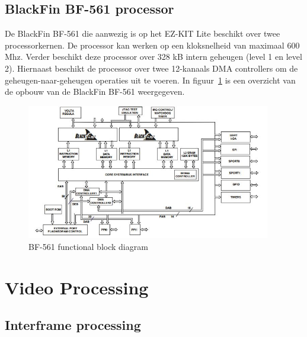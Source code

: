 	\section{BlackFin BF-561 processor}

		\par De BlackFin BF-561 die aanwezig is op het EZ-KIT Lite beschikt over twee processorkernen. De processor kan werken op een kloksnelheid van maximaal 600 Mhz. Verder beschikt deze processor over 328 kB intern geheugen (level 1 en level 2).  Hiernaast beschikt de processor over twee 12-kanaals DMA controllers om de geheugen-naar-geheugen operaties uit te voeren. In figuur~\ref{fig:bf561fbd} is een overzicht van de opbouw van de BlackFin BF-561 weergegeven. 

			\begin{figure}[H]
				\centering
				\includegraphics[width=0.95\textwidth]{Chapters/Chapter4/Images/bf-561.jpg}
				\caption{BF-561 functional block diagram}
				\label{fig:bf561fbd}
			\end{figure}

\chapter{Video Processing}

		
	\section{Interframe processing}
		
